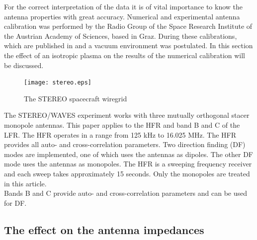 \documentclass[two-column,ras]{agutex}
\begin{document}
\begin{article}
For the correct interpretation of the data it is of vital importance to know the antenna properties with great accuracy. Numerical and experimental antenna calibration was performed by the Radio Group of the Space Research Institute of the Austrian Academy of Sciences, based in Graz. During these calibrations, which are published in \cite{ossi09} and \cite{macher07} a vacuum environment was postulated. In this section the effect of an isotropic plasma on the results of the numerical calibration will be discussed.\\

\begin{figure}
\noindent\texttt{[image: stereo.eps]}
  \caption{The STEREO spacecraft wiregrid}\label{fig:stereo}
\end{figure}

The STEREO/WAVES experiment works with three mutually orthogonal stacer
monopole antennas. This paper applies to the HFR and band B and C of the LFR. The HFR operates in a range from 125 kHz to 16.025 MHz. The HFR provides all auto- and cross-correlation parameters. Two direction finding (DF) modes are implemented, one of which uses the antennas as dipoles. The other DF mode uses
the antennas as monopoles. The HFR is a sweeping frequency receiver and each sweep takes approximately 15 seconds. Only the monopoles are treated in this article.\\

Bands B and C provide auto- and cross-correlation parameters and can be used
for DF.\\
\subsection{The effect on the antenna impedances}


\end{article}
\end{document}
